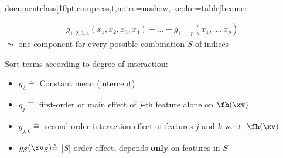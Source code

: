 \\documentclass[10pt,compress,t,notes=noshow, xcolor=table]{beamer}
\newcommand{\open}{}
\newcommand{\close}{}
\begin{document}
\begin{frame}
\begin{definition}
\begin{equation*}
\begin{split}
g_{\open 1, 2, 3, 4 \close}(x_1, x_2, x_3, x_4) + \dots +
g_{\open 1,\ldots,p \close}(x_1, \ldots, x_p)
\end{split}    
\end{equation*}
$\leadsto$ one component for every possible combination $S$ of indices
\end{definition}
Sort terms according to degree of interaction:
\begin{itemize}
\item $g_{\open \emptyset \close} \hat = $ Constant mean (intercept) %
\item $g_{\open j \close} \hat = $ first-order or main effect of $j$-th feature alone on $\fh(\xv)$
\item $g_{\open j, k \close} \hat = $ second-order interaction effect of features $j$ and $k$ w.r.t. $\fh(\xv)$%
\item $g_{S}(\xv_S) \hat = $ $|S|$-order effect, depends \textbf{only} on features in $S$ %
\end{itemize}
\lz
\end{frame}

\end{document}
